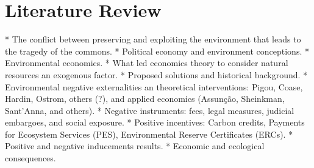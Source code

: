 
\section{Literature Review}

* The conflict between preserving and exploiting the environment that leads to the tragedy of the commons. * Political economy and environment conceptions. * Environmental economics. * What led economics theory to consider natural resources an exogenous factor. * Proposed solutions and historical background. * Environmental negative externalities an theoretical interventions: Pigou, Coase, Hardin, Ostrom, others (?), and applied economics (Assunção, Sheinkman, Sant'Anna, and others). * Negative instruments: fees, legal measures, judicial embargoes, and social exposure. * Positive incentives: Carbon credits, Payments for Ecosystem Services (PES), Environmental Reserve Certificates (ERCs). * Positive and negative inducements results. * Economic and ecological consequences.

